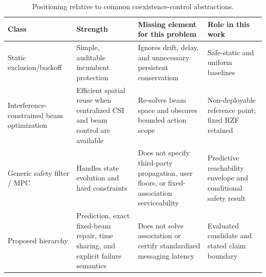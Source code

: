 \begin{table}[t]
\caption{Positioning relative to common coexistence-control abstractions.}
\label{tab:positioning}
\centering
\footnotesize
\setlength{\tabcolsep}{4.0pt}
\renewcommand{\arraystretch}{1.05}
\begin{tabular}{@{}p{}p{}p{}p{}@{}}
\toprule
Class & Strength & Missing element for this problem & Role in this work\\
\midrule
Static exclusion/backoff & Simple, auditable incumbent protection & Ignores drift, delay, and unnecessary persistent conservatism & Safe-static and uniform baselines\\
Interference-constrained beam optimization & Efficient spatial reuse when centralized CSI and beam control are available & Re-solves beam space and obscures bounded action scope & Non-deployable reference point; fixed RZF retained\\
Generic safety filter / MPC & Handles state evolution and hard constraints & Does not specify third-party propagation, user floors, or fixed-association serviceability & Predictive reachability envelope and conditional safety result\\
Proposed hierarchy & Prediction, exact fixed-beam repair, time sharing, and explicit failure semantics & Does not solve association or certify standardized messaging latency & Evaluated candidate and stated claim boundary\\
\bottomrule
\end{tabular}
\end{table}
